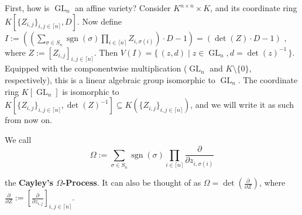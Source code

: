 First, how is $\operatorname{GL}_n$ an affine variety?
Consider $ K^{n \times n} \times K $, and its coordinate ring $ K\left\lbrack \lbrace Z_{i,j} \rbrace_{i,j \in \lceil n \rceil} , D \right\rbrack$.
Now define $ I := \left( \left( \sum_{\sigma \in S_n} \operatorname{sgn} \left( \sigma \right) \prod_{ i \in \lceil n \rceil } Z_{i, \sigma \left( i \right) } \right) \cdot D - 1 \right)  = \left( \operatorname{det} \left( Z \right) \cdot D - 1 \right) $ , where $ Z := \left\lbrack Z_{i,j} \right\rbrack_{i,j \in \lceil n \rceil} $.
Then $ V \left( I \right) = \lbrace \, \left( z , d \right) \mid z \in \operatorname{GL}_n , d = \operatorname{det} \left( z \right)^{-1} \, \rbrace $.
Equipped with the componentwise multiplication ($\operatorname{GL}_n$ and $K \setminus \lbrace 0 \rbrace$, respectively), this is a linear algebraic group isomorphic to $\operatorname{GL}_n$.
The coordinate ring $K\left\lbrack \operatorname{GL}_n\right\rbrack$ is isomorphic to $K \left\lbrack \lbrace Z_{i,j} \rbrace_{i,j \in \lceil n \rceil} , \operatorname{det} \left( Z \right)^{-1} \right\rbrack \subseteq K \left( \lbrace Z_{i,j} \rbrace_{i,j \in \lceil n \rceil} \right) $, and we will write it as such from now on.
\begin{definition}
  We call
  \begin{equation}
    \Omega := \sum_{\sigma \in S_n} \operatorname{sgn} \left( \sigma \right) \prod_{ i \in \lceil n \rceil } \frac{\partial}{\partial z_{i , \sigma \left( i \right)}}
  \end{equation}
\end{definition}
the \textbf{Cayley's $\Omega$-Process}.
It can also be thought of as $ \Omega = \operatorname{det} \left( \frac{\partial}{\partial Z} \right) $, where $\frac{\partial}{\partial Z} := \left\lbrack \frac{\partial}{\partial z_{i,j}} \right\rbrack_{i,j \in \lceil n \rceil} $.

